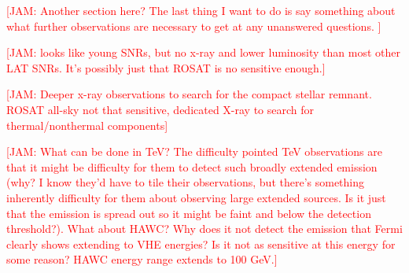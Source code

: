 \documentclass[iop]{emulateapj}
\newcommand{\kibitz}[2]{\ifnum\Comments=1\textcolor{#1}{#2}\fi}
\newcommand{\jamie}[1]{\kibitz{red}      {[JAM: #1]}}
\begin{document}
\jamie{Another section here? The last thing I want to do is say something about what further observations are necessary to get at any unanswered questions. }

\jamie{looks like young SNRs, but no x-ray and lower luminosity than most other LAT SNRs. It's possibly just that ROSAT is no sensitive enough.}

\jamie{Deeper x-ray observations to search for the compact stellar remnant. ROSAT all-sky not that sensitive, dedicated X-ray to search for thermal/nonthermal components}

\jamie{What can be done in TeV? The difficulty pointed TeV observations are that it might be difficulty for them to detect such broadly extended emission (why? I know they'd have to tile their observations, but there's something inherently difficulty for them about observing large extended sources. Is it just that the emission is spread out so it might be faint and below the detection threshold?). What about HAWC? Why does it not detect the emission that Fermi clearly shows extending to VHE energies? Is it not as sensitive at this energy for some reason? HAWC energy range extends to 100 GeV.}


%
%
\end{document}
